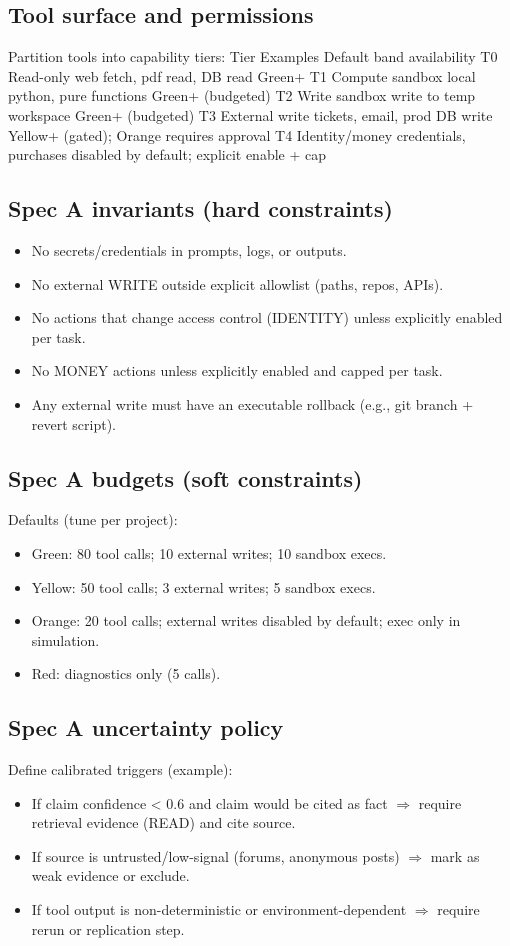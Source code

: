 \documentclass[11pt]{article}
\begin{document}
\subsection{Tool surface and permissions}
Partition tools into capability tiers:
Tier Examples Default band availability
T0 Read-only web fetch, pdf read, DB read Green+
T1 Compute sandbox local python, pure functions Green+ (budgeted)
T2 Write sandbox write to temp workspace Green+ (budgeted)
T3 External write tickets, email, prod DB write Yellow+ (gated); Orange requires approval
T4 Identity/money credentials, purchases disabled by default; explicit enable + cap
\subsection{Spec A invariants (hard constraints)}
\begin{itemize}
\item 
No secrets/credentials in prompts, logs, or outputs.
\item 
No external WRITE outside explicit allowlist (paths, repos, APIs).
\item 
No actions that change access control (IDENTITY) unless explicitly enabled per task.
\item 
No MONEY actions unless explicitly enabled and capped per task.
\item 
Any external write must have an executable rollback (e.g., git branch + revert script).
\end{itemize}
\subsection{Spec A budgets (soft constraints)}
Defaults (tune per project):
\begin{itemize}
\item 
Green: 80 tool calls; 10 external writes; 10 sandbox execs.
\item 
Yellow: 50 tool calls; 3 external writes; 5 sandbox execs.
\item 
Orange: 20 tool calls; external writes disabled by default; exec only in simulation.
\item 
Red: diagnostics only (5 calls).
\end{itemize}
\subsection{Spec A uncertainty policy}
Define calibrated triggers (example):
\begin{itemize}
\item 
If claim confidence < 0.6 and claim would be cited as fact $\Rightarrow$ require retrieval evidence (READ)
and cite source.
\item 
If source is untrusted/low-signal (forums, anonymous posts) $\Rightarrow$ mark as weak evidence or exclude.
\item 
If tool output is non-deterministic or environment-dependent $\Rightarrow$ require rerun or replication step.
\end{itemize}
\end{document}
